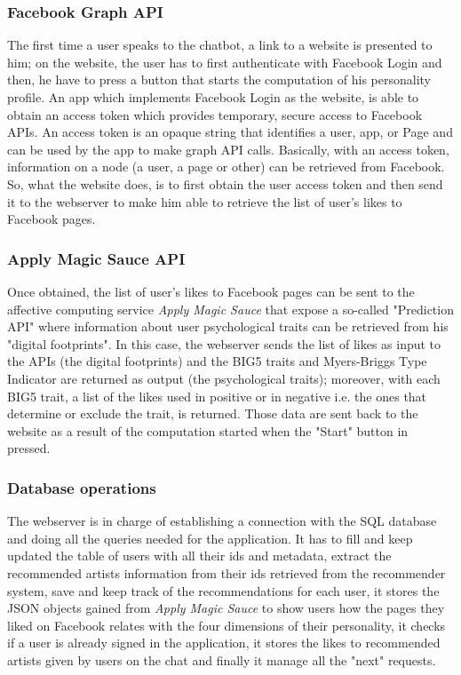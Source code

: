 \documentclass[b5paper,10pt,twoside,cucitura]{toptesi}
\begin{document}
\subsubsection{Facebook Graph API}
The first time a user speaks to the chatbot, a link to a website is presented to him; on the website, the user has to first authenticate with Facebook Login and then, he have to press a button that starts the computation of his personality profile. An app which implements Facebook Login as the website, is able to obtain an access token which provides temporary, secure access to Facebook APIs. An access token is an opaque string that identifies a user, app, or Page and can be used by the app to make graph API calls. Basically, with an access token, information on a node (a user, a page or other) can be retrieved from Facebook. So, what the website does, is to first obtain the user access token and then send it to the webserver to make him able to retrieve the list of user's likes to Facebook pages.

\subsubsection{Apply Magic Sauce API}
Once obtained, the list of user's likes to Facebook pages can be sent to the affective computing service \textit{Apply Magic Sauce} that expose a so-called "Prediction API" where information about user psychological traits can be retrieved from his "digital footprints". In this case, the webserver sends the list of likes as input to the APIs (the digital footprints) and the BIG5 traits and Myers-Briggs Type Indicator are returned as output (the psychological traits); moreover, with each BIG5 trait, a list of the likes used in positive or in negative i.e. the ones that determine or exclude the trait, is returned. Those data are sent back to the website as a result of the computation started when the "Start" button in pressed. 

\subsubsection{Database operations}
The webserver is in charge of establishing a connection with the SQL database and doing all the queries needed for the application. It has to fill and keep updated the table of users with all their ids and metadata, extract the recommended artists information from their ids retrieved from the recommender system, save and keep track of the recommendations for each user, it stores the JSON objects gained from \textit{Apply Magic Sauce} to show users how the pages they liked on Facebook relates with the four dimensions of their personality, it checks if a user is already signed in the application, it stores the likes to recommended artists given by users on the chat and finally it manage all the "next" requests. 
\end{document}
